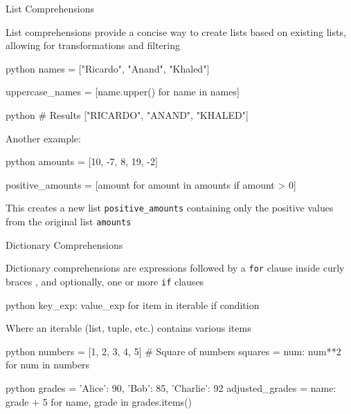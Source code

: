 \documentclass[
	11pt, 
]{beamer}
\begin{document}

\begin{frame}[fragile]{List Comprehensions}

List comprehensions provide a concise way to create lists based on existing lists, allowing for transformations and filtering

\begin{mintedbox}{python}
names = ["Ricardo", "Anand", "Khaled"]

uppercase_names = [name.upper() for name in names]
\end{mintedbox}
\begin{mintedbox}{python} 
# Results
["RICARDO", "ANAND", "KHALED"]
\end{mintedbox}

Another example:

\begin{mintedbox}{python}
amounts = [10, -7, 8, 19, -2]

positive_amounts = [amount for amount in amounts if amount > 0]
\end{mintedbox}

This creates a new list \texttt{positive\_amounts} containing only the positive values from the original list \texttt{amounts}

\end{frame}


\begin{frame}[fragile]{Dictionary Comprehensions}

Dictionary comprehensions are expressions followed by a \texttt{for} clause inside curly braces {}, and optionally, one or more \texttt{if} clauses

\begin{mintedbox}{python}
{key_exp: value_exp for item in iterable if condition}
\end{mintedbox}

Where an iterable (list, tuple, etc.) contains various items

\begin{mintedbox}{python}
numbers = [1, 2, 3, 4, 5] # Square of numbers
squares = {num: num**2 for num in numbers}
\end{mintedbox}

\begin{mintedbox}{python}
grades = {'Alice': 90, 'Bob': 85, 'Charlie': 92} 
adjusted_grades = {name: grade + 5 for name, grade in grades.items()}
\end{mintedbox}

\end{frame}
\end{document}
